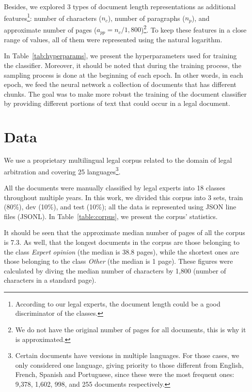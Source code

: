\documentclass[11pt]{article}
\begin{document}
    Besides, we explored 3 types of document length representations as additional features\footnote{According to our legal experts, the document length could be a good discriminator of the classes.}: number of characters ($n_c$), number of paragraphs ($n_p$), %
    and approximate number of pages ($a_{pp} = n_c / 1,800$)\footnote{We do not have the original number of pages for all documents, this is why it is approximated.}. To keep these features in a close range of values, all of them were represented using the natural logarithm.

    In Table~\ref{tab:hyperparams}, we present the hyperparameters used for training the classifier. Moreover, it should be noted that during the training process, the sampling process is done at the beginning of each epoch. In other words, in each epoch, we feed the neural network a collection of documents that has different chunks. The goal was to make more robust the training of the document classifier by providing different portions of text that could occur in a legal document.

    

\section{Data}
\label{sec: Data}

    We use a proprietary multilingual legal corpus related to the domain of legal arbitration and covering 25 languages\footnote{Certain documents have versions in multiple languages. For those cases, we only considered one language, giving priority to those different from English, French, Spanish and Portuguese, since these were the most frequent ones: 9,378, 1,602, 998, and 255 documents respectively.}.
    
    All the documents were manually classified by legal experts into 18 classes throughout multiple years. In this work, we divided this corpus into 3 sets, train (80\%), dev (10\%), and test (10\%); all the data is represented using JSON line files (JSONL). 
    In Table~\ref{table:corpus}, we present the corpus' statistics.

    It should be seen that the approximate median number of pages of all the corpus is 7.3. As well, that the longest documents in the corpus are those belonging to the class \textit{Expert opinion} (the median is 38.8 pages), while the shortest ones are those belonging to the class \textit{Other} (the median is 1 page). These figures were calculated by diving the median number of characters by 1,800 (number of characters in a standard page).
\end{document}
